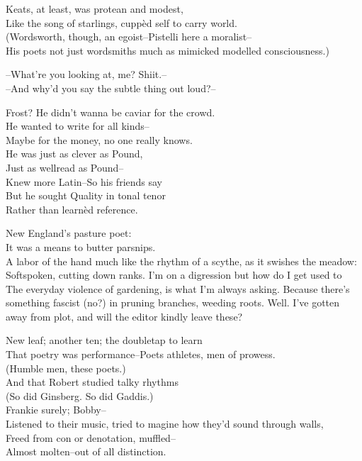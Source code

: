 Keats, at least, was protean and modest, \\
Like the song of starlings, cuppèd self to carry world. \\
(Wordsworth, though, an egoist--Pistelli here a moralist-- \\
His poets not just wordsmiths much as mimicked modelled consciousness.)

--What're you looking at, me? Shiit.-- \\
--And why'd you say the subtle thing out loud?--

Frost? He didn't wanna be caviar for the crowd. \\
He wanted to write for all kinds-- \\
Maybe for the money, no one really knows. \\
He was just as clever as Pound, \\
Just as wellread as Pound-- \\
Knew more Latin--So his friends say \\
But he sought Quality in tonal tenor \\
Rather than learnèd reference.

New England's pasture poet: \\
It was a means to butter parsnips. \\
A labor of the hand much like the rhythm of a scythe, as it swishes the meadow: \\
Softspoken, cutting down ranks. I'm on a digression but how do I get used to \\
The everyday violence of gardening, is what I'm always asking. Because there's something fascist (no?) in pruning branches, weeding roots. Well. I've gotten away from plot, and will the editor kindly leave these?

New leaf; another ten; the doubletap to learn \\
That poetry was performance--Poets athletes, men of prowess. \\
(Humble men, these poets.) \\
And that Robert studied talky rhythms \\
(So did Ginsberg. So did Gaddis.) \\
Frankie surely; Bobby-- \\
Listened to their music, tried to magine how they'd sound through walls, \\
Freed from con or denotation, muffled-- \\
Almost molten--out of all distinction.

